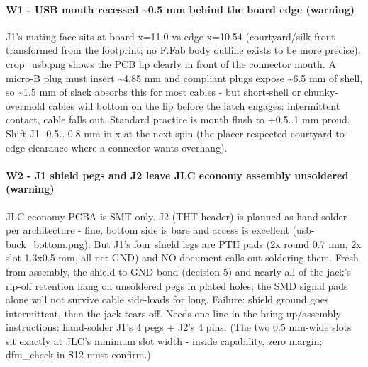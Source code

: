 \documentclass[11pt,a4paper]{article}
\begin{document}
\paragraph*{W1 - USB mouth recessed \textasciitilde{}0.5 mm behind the board edge (warning)}
J1's mating face sits at board x=11.0 vs edge x=10.54 (courtyard/silk front transformed from the footprint; no F.Fab body outline exists to be more precise). crop\_usb.png shows the PCB lip clearly in front of the connector mouth. A micro-B plug must insert \textasciitilde{}4.85 mm and compliant plugs expose \textasciitilde{}6.5 mm of shell, so \textasciitilde{}1.5 mm of slack absorbs this for most cables - but short-shell or chunky-overmold cables will bottom on the lip before the latch engages: intermittent contact, cable falls out. Standard practice is mouth flush to +0.5..1 mm proud. Shift J1 -0.5..-0.8 mm in x at the next spin (the placer respected courtyard-to-edge clearance where a connector wants overhang).

\paragraph*{W2 - J1 shield pegs and J2 leave JLC economy assembly unsoldered (warning)}
JLC economy PCBA is SMT-only. J2 (THT header) is planned as hand-solder per architecture - fine, bottom side is bare and access is excellent (usb-buck\_bottom.png). But J1's four shield legs are PTH pads (2x round 0.7 mm, 2x slot 1.3x0.5 mm, all net GND) and NO document calls out soldering them. Fresh from assembly, the shield-to-GND bond (decision 5) and nearly all of the jack's rip-off retention hang on unsoldered pegs in plated holes; the SMD signal pads alone will not survive cable side-loads for long. Failure: shield ground goes intermittent, then the jack tears off. Needs one line in the bring-up/assembly instructions: hand-solder J1's 4 pegs + J2's 4 pins. (The two 0.5 mm-wide slots sit exactly at JLC's minimum slot width - inside capability, zero margin; dfm\_check in S12 must confirm.)
\end{document}
